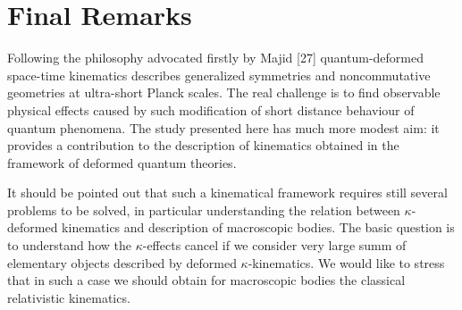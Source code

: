 \documentclass[a4paper,12pt]{article}
\begin{document}
\section{Final Remarks}
Following the philosophy advocated firstly by Majid [27]
quantum-deformed space-time kinematics describes generalized
symmetries and noncommutative geometries at ultra-short Planck
scales. The real challenge is to find observable physical effects
caused by such modification of short distance behaviour of quantum
phenomena. The study presented here has much more modest aim: it
provides a contribution to the description of kinematics obtained
in the framework of deformed quantum theories.

It should be pointed out that such a kinematical framework
requires still several problems to be solved, in particular
understanding the relation between $\kappa$-deformed kinematics
and description of macroscopic bodies. The basic question is to
understand how the $\kappa$-effects cancel if we consider very
large summ of elementary objects described by deformed
$\kappa$-kinematics. We would like to stress that in such a case
we should obtain for macroscopic bodies the classical relativistic
kinematics.
\end{document}
